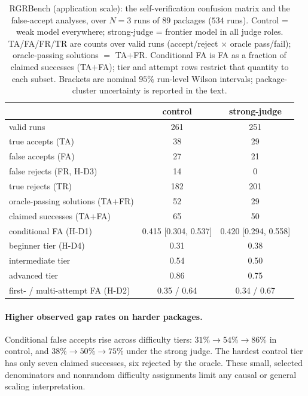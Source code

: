 \begin{table}[t]
\centering
\caption{RGRBench (application scale): the self-verification confusion matrix and the
false-accept analyses, over $N{=}3$ runs of $89$ packages ($534$ runs). Control = weak model
everywhere; strong-judge = frontier model in all judge roles. TA/FA/FR/TR are counts over
valid runs (accept/reject $\times$ oracle pass/fail); oracle-passing solutions $=$ TA${+}$FR.
Conditional FA is FA as a fraction of claimed successes (TA${+}$FA); tier and attempt rows
restrict that quantity to each subset. Brackets are nominal $95\%$ run-level Wilson
intervals; package-cluster uncertainty is reported in the text.}
\label{tab:scale}
\small
\begin{tabular}{lcc}
\toprule
 & control & strong-judge \\
\midrule
valid runs                           & 261 & 251 \\
true accepts (TA)                    & 38  & 29  \\
false accepts (FA)                   & 27  & 21  \\
false rejects (FR, H-D3)             & 14  & 0   \\
true rejects (TR)                    & 182 & 201 \\
oracle-passing solutions (TA${+}$FR) & 52  & 29  \\
\midrule
claimed successes (TA${+}$FA)        & 65 & 50 \\
conditional FA (H-D1) & 0.415 [0.304, 0.537] & 0.420 [0.294, 0.558] \\
\quad beginner tier (H-D4) & 0.31 & 0.38 \\
\quad intermediate tier & 0.54 & 0.50 \\
\quad advanced tier & 0.86 & 0.75 \\
first- / multi-attempt FA (H-D2) & 0.35 / 0.64 & 0.34 / 0.67 \\
\bottomrule
\end{tabular}
\end{table}

\paragraph{Higher observed gap rates on harder packages.} Conditional false accepts rise
across difficulty tiers: $31\% \to 54\% \to 86\%$ in control,
and $38\% \to 50\% \to 75\%$ under the strong judge. The hardest control tier has only seven
claimed successes, six rejected by the oracle. These small, selected denominators and
nonrandom difficulty assignments limit any causal or general scaling interpretation.



